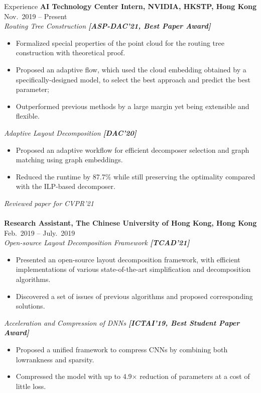 
\begin{rSection}{Experience}
{\bf AI Technology Center Intern, NVIDIA, HKSTP, Hong Kong}               \hfill { Nov.~2019 -- Present} \\
\textit{Routing Tree Construction \textbf{[{ASP-DAC'21, Best Paper Award}]}}
\begin{itemize}[noitemsep,topsep=-5pt]
    \item Formalized special properties of the point cloud for the routing tree construction with theoretical proof.
    \item Proposed an adaptive flow, which used the cloud embedding obtained by a specifically-designed model, to select the best approach and predict the best parameter;
    \item Outperformed previous methods by a large margin yet being extensible and flexible.
\end{itemize}
\textit{Adaptive Layout Decomposition \textbf{[{DAC'20}]}}
\begin{itemize}[noitemsep,topsep=-5pt]
    \item Proposed an adaptive workflow for efficient decomposer selection and graph matching using graph embeddings.
    \item Reduced the runtime by 87.7\% while still preserving the optimality compared with the ILP-based decomposer.
\end{itemize}
\textit{Reviewed paper for CVPR'21}\\ \\
{\bf Research Assistant, The Chinese University of Hong Kong, Hong Kong}               \hfill { Feb.~2019 -- July.~2019} \\
\textit{Open-source Layout Decomposition Framework \textbf{[{TCAD'21}]}}
\begin{itemize}[noitemsep,topsep=-5pt]
    \item Presented an open-source layout decomposition framework, with efficient implementations of various state-of-the-art simplification and decomposition algorithms.
    \item Discovered a set of issues of previous algorithms and proposed corresponding solutions. \\
\end{itemize}

\textit{Acceleration and Compression of DNNs \textbf{[{ICTAI'19, Best Student Paper Award}]}}
\begin{itemize}[noitemsep,topsep=-5pt]
    \item Proposed a unified framework to compress CNNs by combining both lowrankness and sparsity.
    \item Compressed the model with up to 4.9$\times$ reduction of parameters at a cost of little loss. \\
\end{itemize}


\end{rSection}
